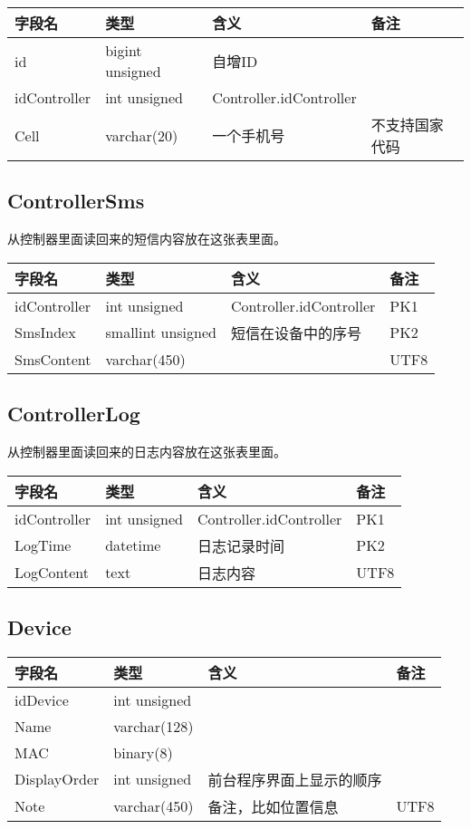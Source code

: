 \begin{longtabu}[c]{@{}lXXX@{}}
\toprule
字段名 & 类型 & 含义 & 备注\tabularnewline
\midrule
\endhead
id & bigint unsigned & 自增ID &\tabularnewline
idController & int unsigned & Controller.idController &\tabularnewline
Cell & varchar(20) & 一个手机号 & 不支持国家代码\tabularnewline
\bottomrule
\end{longtabu}

\subsection{ControllerSms}\label{controllersms}

从控制器里面读回来的短信内容放在这张表里面。

\begin{longtabu}[c]{@{}lXXX@{}}
\toprule
字段名 & 类型 & 含义 & 备注\tabularnewline
\midrule
\endhead
idController & int unsigned & Controller.idController &
PK1\tabularnewline
SmsIndex & smallint unsigned & 短信在设备中的序号 & PK2\tabularnewline
SmsContent & varchar(450) & & UTF8\tabularnewline
\bottomrule
\end{longtabu}

\subsection{ControllerLog}\label{controllerlog}

从控制器里面读回来的日志内容放在这张表里面。

\begin{longtabu}[c]{@{}lXXX@{}}
\toprule
字段名 & 类型 & 含义 & 备注\tabularnewline
\midrule
\endhead
idController & int unsigned & Controller.idController &
PK1\tabularnewline
LogTime & datetime & 日志记录时间 & PK2\tabularnewline
LogContent & text & 日志内容 & UTF8\tabularnewline
\bottomrule
\end{longtabu}

\subsection{Device}\label{device}

\begin{longtabu}[c]{@{}lXXX@{}}
\toprule
字段名 & 类型 & 含义 & 备注\tabularnewline
\midrule
\endhead
idDevice & int unsigned & &\tabularnewline
Name & varchar(128) & &\tabularnewline
MAC & binary(8) & &\tabularnewline
DisplayOrder & int unsigned & 前台程序界面上显示的顺序 &\tabularnewline
Note & varchar(450) & 备注，比如位置信息 & UTF8\tabularnewline
\bottomrule
\end{longtabu}

